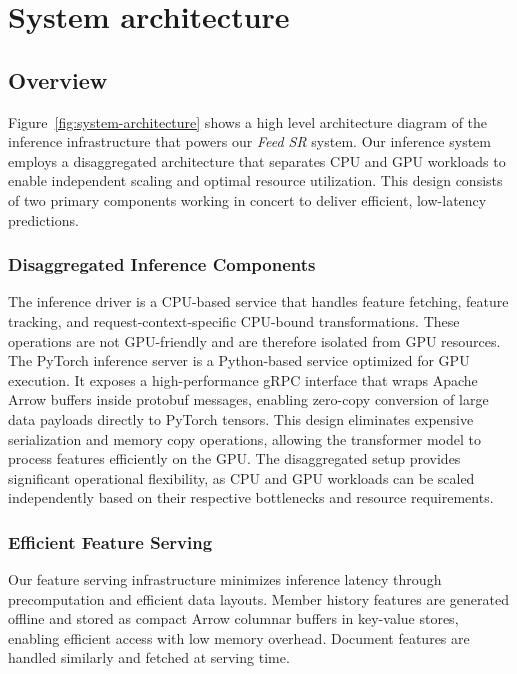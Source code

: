 \documentclass[sigconf]{acmart}
\newcommand{\systemname}{\textit{Feed SR}}
\begin{document}
\section{System architecture}
\subsection{Overview}
Figure~\ref{fig:system-architecture} shows a high level architecture diagram of the inference infrastructure that powers our {\systemname} system.
Our inference system employs a disaggregated architecture that separates CPU and GPU workloads to enable independent scaling and optimal resource utilization. This design consists of two primary components working in concert to deliver efficient, low-latency predictions.
\subsubsection{Disaggregated Inference Components}
The inference driver is a CPU-based service that handles feature fetching, feature tracking, and request-context-specific CPU-bound transformations. These operations are not GPU-friendly and are therefore isolated from GPU resources. The PyTorch inference server is a Python-based service optimized for GPU execution. It exposes a high-performance gRPC interface that wraps Apache Arrow buffers inside protobuf messages, enabling zero-copy conversion of large data payloads directly to PyTorch tensors. This design eliminates expensive serialization and memory copy operations, allowing the transformer model to process features efficiently on the GPU. The disaggregated setup provides significant operational flexibility, as CPU and GPU workloads can be scaled independently based on their respective bottlenecks and resource requirements.
\subsubsection{Efficient Feature Serving}
Our feature serving infrastructure minimizes inference latency through precomputation and efficient data layouts. Member history features are generated offline and stored as compact Arrow columnar buffers in key-value stores, enabling efficient access with low memory overhead. Document features are handled similarly and fetched at serving time.
\end{document}
